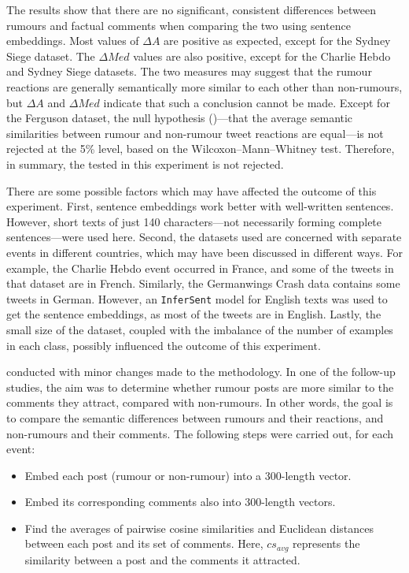 The results show that there are no significant, consistent differences between rumours and factual comments when comparing the two using sentence embeddings. Most values of $\Delta A$ are positive as expected, except for the Sydney Siege dataset. The $\Delta Med$ values are also positive, except for the Charlie Hebdo and Sydney Siege datasets. The two measures may suggest that the rumour reactions are generally semantically more similar to each other than non-rumours, but $\Delta A$ and $\Delta Med$ indicate that such a conclusion cannot be made. Except for the Ferguson dataset, the null hypothesis ()—that the average semantic similarities between rumour and non-rumour tweet reactions are equal—is not rejected at the 5\% level, based on the Wilcoxon–Mann–Whitney test. Therefore, in summary, the  tested in this experiment is not rejected.

There are some possible factors which may have affected the outcome of this experiment. First, sentence embeddings work better with well-written sentences. However, short texts of just 140 characters—not necessarily forming complete sentences—were used here. Second, the datasets used are concerned with separate events in different countries, which may have been discussed in different ways. For example, the Charlie Hebdo event occurred in France, and some of the tweets in that dataset are in French. Similarly, the Germanwings Crash data contains some tweets in German. However, an \texttt{InferSent} model for English texts was used to get the sentence embeddings, as most of the tweets are in English. Lastly, the small size of the dataset, coupled with the imbalance of the number of examples in each class, possibly influenced the outcome of this experiment.

 conducted with minor changes made to the methodology. In one of the follow-up studies, the aim was to determine whether rumour posts are more similar to the comments they attract, compared with non-rumours. In other words, the goal is to compare the semantic differences between rumours and their reactions, and non-rumours and their comments. The following steps were carried out, for each event:

\begin{itemize}
  \item Embed each post (rumour or non-rumour) into a 300-length vector.
  \item Embed its corresponding comments also into 300-length vectors.
  \item Find the averages of pairwise cosine similarities and Euclidean distances between each post and its set of comments. Here, $cs_{avg}$ represents the similarity between a post and the comments it attracted.
\end{itemize}


